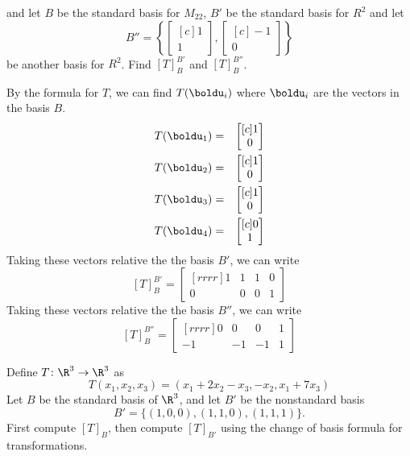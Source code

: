 and let $B$ be the standard basis for $M_{22}$, $B'$ be the standard basis for $R^2$ and let
$$
B'' = \left\{
\begin{bmatrix}[c]
1\\
1
\end{bmatrix},
\begin{bmatrix}[c]
-1\\
0
\end{bmatrix}
\right\}
$$
be another basis for $R^2$. Find $[T]_{B}^{B'}$ and $[T]_{B}^{B''}$.
\\
\begin{solution}
\noindent By the formula for $T$, we can find $T(\boldu_i)$ where $\boldu_i$ are the vectors in the basis $B$.
\begin{eqnarray*}
T(\boldu_1) &=& 
\begin{bmatrix}[c]
1\\
0
\end{bmatrix}\\
T(\boldu_2) &=& 
\begin{bmatrix}[c]
1\\
0
\end{bmatrix}\\
T(\boldu_3) &=& 
\begin{bmatrix}[c]
1\\
0
\end{bmatrix}\\
T(\boldu_4) &=& 
\begin{bmatrix}[c]
0\\
1
\end{bmatrix}
\end{eqnarray*}
Taking these vectors relative the the basis $B'$, we can write
$$
[T]_{B}^{B'} =
\begin{bmatrix}[rrrr]
1&1&1&0\\
0&0&0&1
\end{bmatrix}
$$
Taking these vectors relative the the basis $B''$, we can write
$$
[T]_{B}^{B''} =
\begin{bmatrix}[rrrr]
0&0&0&1\\
-1&-1&-1&1
\end{bmatrix}
$$
\end{solution}
\ii Define $T\colon \R^3\rightarrow\R^3$ as 
$$
T(x_1,x_2,x_3) = (x_1+2x_2-x_3,-x_2,x_1+7x_3)
$$
Let $B$ be the standard basis of $\R^3$, and let $B'$ be the nonstandard basis 
$$
B' = \{(1,0,0),(1,1,0),(1,1,1)\}.
$$
First compute $[T]_B$, then compute $[T]_{B'}$ using the change of basis formula for transformations. 
\\
